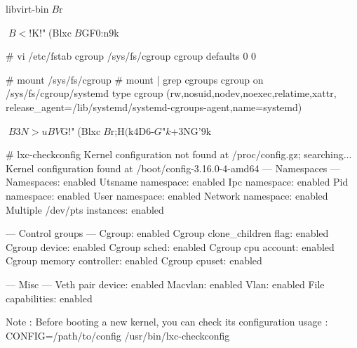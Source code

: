 \documentclass[mingoth,a4paper]{jsarticle}
\begin{document}
{{{{{{libvirt-bin$B$r%


$B<!$K!"(Blxc$B$GF0:n$9$k%

\begin{commandline}
  # vi /etc/fstab
  cgroup  /sys/fs/cgroup  cgroup  defaults  0   0

  # mount /sys/fs/cgroup
  # mount | grep cgroups
  cgroup on /sys/fs/cgroup/systemd type cgroup (rw,nosuid,nodev,noexec,relatime,xattr,
  release_agent=/lib/systemd/systemd-cgroups-agent,name=systemd)
\end{commandline}

$B$3$N>uBV$G!"(Blxc$B$r;H$($k4D6-$G$"$k$+3NG'$9$k%

\begin{commandline}
  # lxc-checkconfig
  Kernel configuration not found at /proc/config.gz; searching...
  Kernel configuration found at /boot/config-3.16.0-4-amd64
  --- Namespaces ---
  Namespaces: enabled
  Utsname namespace: enabled
  Ipc namespace: enabled
  Pid namespace: enabled
  User namespace: enabled
  Network namespace: enabled
  Multiple /dev/pts instances: enabled

  --- Control groups ---
  Cgroup: enabled
  Cgroup clone_children flag: enabled
  Cgroup device: enabled
  Cgroup sched: enabled
  Cgroup cpu account: enabled
  Cgroup memory controller: enabled
  Cgroup cpuset: enabled

  --- Misc ---
  Veth pair device: enabled
  Macvlan: enabled
  Vlan: enabled
  File capabilities: enabled

  Note : Before booting a new kernel, you can check its configuration
  usage : CONFIG=/path/to/config /usr/bin/lxc-checkconfig
\end{commandline}

}}}}}}
\end{document}
